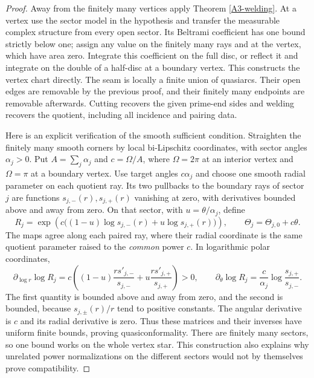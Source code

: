 \begin{proof}
Away from the finitely many vertices apply Theorem \ref{A3-welding}. At a vertex use the sector model in the hypothesis and transfer the measurable complex structure from every open sector. Its Beltrami coefficient has one bound strictly below one; assign any value on the finitely many rays and at the vertex, which have area zero. Integrate this coefficient on the full disc, or reflect it and integrate on the double of a half-disc at a boundary vertex. This constructs the vertex chart directly. The seam is locally a finite union of quasiarcs. Their open edges are removable by the previous proof, and their finitely many endpoints are removable afterwards. Cutting recovers the given prime-end sides and welding recovers the quotient, including all incidence and pairing data.

Here is an explicit verification of the smooth sufficient condition. Straighten the finitely many smooth corners by local bi-Lipschitz coordinates, with sector angles $\alpha_j>0$. Put $A=\sum_j\alpha_j$ and $c=\Omega/A$, where $\Omega=2\pi$ at an interior vertex and $\Omega=\pi$ at a boundary vertex. Use target angles $c\alpha_j$ and choose one smooth radial parameter on each quotient ray. Its two pullbacks to the boundary rays of sector $j$ are functions $s_{j,-}(r),s_{j,+}(r)$ vanishing at zero, with derivatives bounded above and away from zero. On that sector, with $u=\theta/\alpha_j$, define
\[
 R_j=\exp\!\left(c\bigl((1-u)\log s_{j,-}(r)
                   +u\log s_{j,+}(r)\bigr)\right),
 \qquad \Theta_j=\Theta_{j,0}+c\theta .
\]
The maps agree along each paired ray, where their radial coordinate is the same quotient parameter raised to the \emph{common} power $c$. In logarithmic polar coordinates,
\[
 \partial_{\log r}\log R_j
 =c\left((1-u)\frac{r s'_{j,-}}{s_{j,-}}
                 +u\frac{r s'_{j,+}}{s_{j,+}}\right)>0,
 \qquad
 \partial_\theta\log R_j
 =\frac c{\alpha_j}\log\frac{s_{j,+}}{s_{j,-}}.
\]
The first quantity is bounded above and away from zero, and the second is bounded, because $s_{j,\pm}(r)/r$ tend to positive constants. The angular derivative is $c$ and its radial derivative is zero. Thus these matrices and their inverses have uniform finite bounds, proving quasiconformality. There are finitely many sectors, so one bound works on the whole vertex star. This construction also explains why unrelated power normalizations on the different sectors would not by themselves prove compatibility.
\end{proof}

